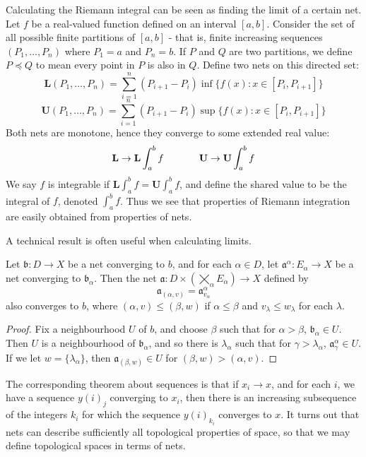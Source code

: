 \begin{example}
    Calculating the Riemann integral can be seen as finding the limit of a certain net. Let $f$ be a real-valued function defined on an interval $[a,b]$. Consider the set of all possible finite partitions of $[a,b]$ - that is, finite increasing sequences $(P_1, \dots, P_n)$ where $P_1 = a$ and $P_n = b$. If $P$ and $Q$ are two partitions, we define $P \preceq Q$ to mean every point in $P$ is also in $Q$. Define two nets on this directed set:
    \[ \mathbf{L}(P_1, \dots, P_n) = \sum_{i = 1}^n (P_{i+1} - P_i) \inf \{ f(x) : x \in [P_i, P_{i+1}] \} \]
    \[ \mathbf{U}(P_1, \dots, P_n) = \sum_{i = 1}^n (P_{i+1} - P_i) \sup \{ f(x) : x \in [P_i, P_{i+1}] \} \]
    Both nets are monotone, hence they converge to some extended real value:
    \[ \mathbf{L} \to \mathbf{L} \int_a^b f \hspace{0.5in} \mathbf{U} \to \mathbf{U} \int_a^b f \]
    We say $f$ is integrable if $\mathbf{L} \int_a^b f = \mathbf{U} \int_a^b f$, and define the shared value to be the integral of $f$, denoted $\int_a^b f$. Thus we see that properties of Riemann integration are easily obtained from properties of nets.
\end{example}

A technical result is often useful when calculating limits.

\begin{theorem}
    Let $\mathfrak{b}: D \to X$ be a net converging to $b$, and for each $\alpha \in D$, let $\mathfrak{a}^\alpha: E_\alpha \to X$ be a net converging to $\mathfrak{b}_\alpha$. Then the net $\mathfrak{a}: D \times (\bigtimes_\alpha E_\alpha) \to X$ defined by
    \[ \mathfrak{a}_{(\alpha, v)} = \mathfrak{a}^\alpha_{v_\alpha} \]
    also converges to $b$, where $(\alpha, v) \leq (\beta, w)$ if $\alpha \leq \beta$ and $v_\lambda \leq w_\lambda$ for each $\lambda$.
\end{theorem}
\begin{proof}
    Fix a neighbourhood $U$ of $b$, and choose $\beta$ such that for $\alpha > \beta$, $\mathfrak{b}_\alpha \in U$. Then $U$ is a neighbourhood of $\mathfrak{b}_\alpha$, and so there is $\lambda_\alpha$ such that for $\gamma > \lambda_\alpha$, $\mathfrak{a}^\alpha_\gamma \in U$. If we let $w = \{ \lambda_\alpha \}$, then $\mathfrak{a}_{(\beta, w)} \in U$ for $(\beta, w) > (\alpha, v)$.
\end{proof}

The corresponding theorem about sequences is that if $x_i \to x$, and for each $i$, we have a sequence $y(i)_j$ converging to $x_i$, then there is an increasing subsequence of the integers $k_i$ for which the sequence $y(i)_{k_i}$ converges to $x$. It turns out that nets can describe sufficiently all topological properties of space, so that we may define topological spaces in terms of nets.

